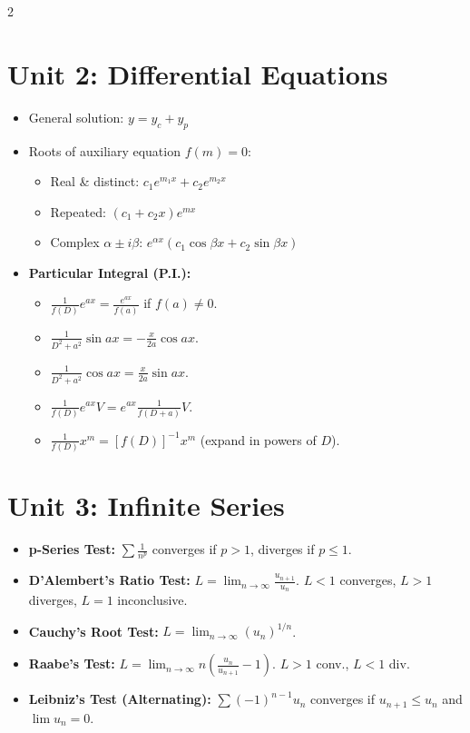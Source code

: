 \begin{multicols}{2}
{\section*{Unit 2: Differential Equations}
\begin{itemize}[leftmargin=*]
    \item General solution: $y = y_c + y_p$
    \item Roots of auxiliary equation $f(m) = 0$:
    \begin{itemize}
        \item Real \& distinct: $c_1 e^{m_1 x} + c_2 e^{m_2 x}$
        \item Repeated: $(c_1 + c_2 x) e^{m x}$
        \item Complex $\alpha \pm i\beta$: $e^{\alpha x}(c_1 \cos\beta x + c_2 \sin\beta x)$
    \end{itemize}
    \item \textbf{Particular Integral (P.I.):}
    \begin{itemize}
        \item $\frac{1}{f(D)} e^{ax} = \frac{e^{ax}}{f(a)}$ if $f(a) \neq 0$.
        \item $\frac{1}{D^2+a^2} \sin ax = -\frac{x}{2a}\cos ax$.
        \item $\frac{1}{D^2+a^2} \cos ax = \frac{x}{2a}\sin ax$.
        \item $\frac{1}{f(D)} e^{ax}V = e^{ax}\frac{1}{f(D+a)} V$.
        \item $\frac{1}{f(D)} x^m = [f(D)]^{-1} x^m$ (expand in powers of $D$).
    \end{itemize}
\end{itemize}

\section*{Unit 3: Infinite Series}
\begin{itemize}[leftmargin=*]
    \item \textbf{p-Series Test:} $\sum \frac{1}{n^p}$ converges if $p > 1$, diverges if $p \le 1$.
    \item \textbf{D'Alembert's Ratio Test:} $L = \lim_{n\to\infty} \frac{u_{n+1}}{u_n}$. $L < 1$ converges, $L > 1$ diverges, $L=1$ inconclusive.
    \item \textbf{Cauchy's Root Test:} $L = \lim_{n\to\infty} (u_n)^{1/n}$.
    \item \textbf{Raabe's Test:} $L = \lim_{n\to\infty} n\left(\frac{u_n}{u_{n+1}} - 1\right)$. $L > 1$ conv., $L < 1$ div.
    \item \textbf{Leibniz's Test (Alternating):} $\sum (-1)^{n-1} u_n$ converges if $u_{n+1} \le u_n$ and $\lim u_n = 0$.
\end{itemize}

}
\end{multicols}

